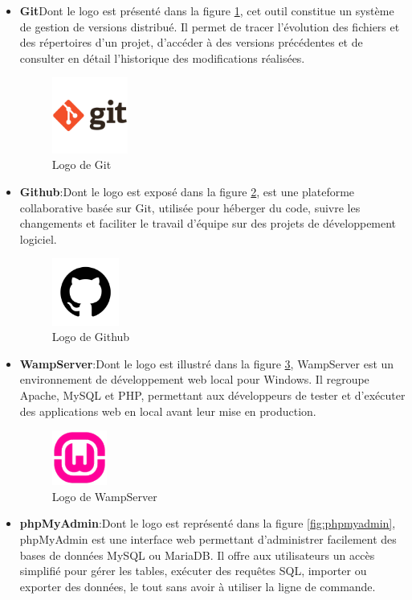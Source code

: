 \begin{itemize}
 \item \textbf{Git}Dont le logo est présenté dans la figure \ref{fig:git}, cet outil constitue un système de gestion de versions distribué. Il permet de tracer l’évolution des fichiers et des répertoires d’un projet, d’accéder à des versions précédentes et de consulter en détail l’historique des modifications réalisées.
 \begin{figure}[h]
    \centering
    \includegraphics[width=2.5cm]{images/git.png}
    \caption{Logo de Git}
    \label{fig:git}
\end{figure}
\item \textbf{Github}:Dont le logo est exposé dans la figure \ref{fig:gituhbl}, 
 est une plateforme collaborative basée sur Git, utilisée pour héberger du code, suivre les changements et faciliter le travail d’équipe sur des projets de développement logiciel.
 \begin{figure}[h]
    \centering
    \includegraphics[width=2.2cm]{images/githubl.png}
    \caption{Logo de Github}
    \label{fig:gituhbl}
\end{figure}
\item \textbf{WampServer}:Dont le logo est illustré dans la figure \ref{fig:wamp}, WampServer est un environnement de développement web local pour Windows. Il regroupe Apache, MySQL et PHP, permettant aux développeurs de tester et d’exécuter des applications web en local avant leur mise en production.
 \begin{figure}[h]
    \centering
    \includegraphics[width=1.8cm]{images/WampServer.png}
    \caption{Logo de WampServer}
    \label{fig:wamp}
\end{figure}
\newpage
\item \textbf{phpMyAdmin}:Dont le logo est représenté dans la figure \ref{fig:phpmyadmin}, phpMyAdmin est une interface web permettant d’administrer facilement des bases de données MySQL ou MariaDB. Il offre aux utilisateurs un accès simplifié pour gérer les tables, exécuter des requêtes SQL, importer ou exporter des données, le tout sans avoir à utiliser la ligne de commande.

\end{itemize}
